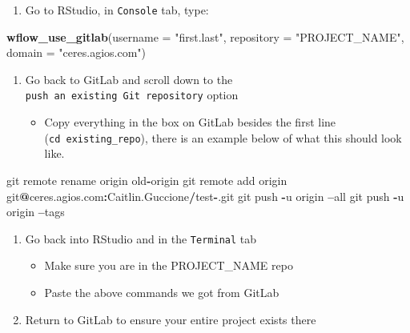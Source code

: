 \documentclass[openany]{article}
\newenvironment{Shaded}{\begin{snugshade}}{\end{snugshade}}
\newcommand{\DataTypeTok}[1]{\textcolor[rgb]{0.13,0.29,0.53}{#1}}
\newcommand{\KeywordTok}[1]{\textcolor[rgb]{0.13,0.29,0.53}{\textbf{#1}}}
\newcommand{\NormalTok}[1]{#1}
\newcommand{\OperatorTok}[1]{\textcolor[rgb]{0.81,0.36,0.00}{\textbf{#1}}}
\newcommand{\StringTok}[1]{\textcolor[rgb]{0.31,0.60,0.02}{#1}}
\providecommand{\tightlist}{%
  \setlength{\itemsep}{0pt}\setlength{\parskip}{0pt}}
\begin{document}
\begin{enumerate}
\def\labelenumi{\arabic{enumi}.}
\tightlist
\item
  Go to RStudio, in \texttt{Console} tab, type:
\end{enumerate}

\begin{Shaded}
\begin{Highlighting}[]
\KeywordTok{wflow_use_gitlab}\NormalTok{(}\DataTypeTok{username =} \StringTok{"first.last"}\NormalTok{, }
    \DataTypeTok{repository =} \StringTok{"PROJECT_NAME"}\NormalTok{, }
    \DataTypeTok{domain =} \StringTok{"ceres.agios.com"}\NormalTok{)}
\end{Highlighting}
\end{Shaded}

\begin{enumerate}
\def\labelenumi{\arabic{enumi}.}
\setcounter{enumi}{1}
\tightlist
\item
  Go back to GitLab and scroll down to the \texttt{push\ an\ existing\ Git\ repository} option

  \begin{itemize}
  \tightlist
  \item
    Copy everything in the box on GitLab besides the first line (\texttt{cd\ existing\_repo}), there is an example below of what this should look like.
  \end{itemize}
\end{enumerate}

\begin{Shaded}
\begin{Highlighting}[]
\NormalTok{git remote rename origin old}\OperatorTok{-}\NormalTok{origin}
\NormalTok{git remote add origin git}\OperatorTok{@}\NormalTok{ceres.agios.com}\OperatorTok{:}\NormalTok{Caitlin.Guccione}\OperatorTok{/}\NormalTok{test}\OperatorTok{-}\NormalTok{.git}
\NormalTok{git push }\OperatorTok{-}\NormalTok{u origin }\OperatorTok{--}\NormalTok{all}
\NormalTok{git push }\OperatorTok{-}\NormalTok{u origin }\OperatorTok{--}\NormalTok{tags}
\end{Highlighting}
\end{Shaded}

\begin{enumerate}
\def\labelenumi{\arabic{enumi}.}
\setcounter{enumi}{2}
\tightlist
\item
  Go back into RStudio and in the \texttt{Terminal} tab

  \begin{itemize}
  \tightlist
  \item
    Make sure you are in the PROJECT\_NAME repo
  \item
    Paste the above commands we got from GitLab
  \end{itemize}
\item
  Return to GitLab to ensure your entire project exists there
\end{enumerate}
\end{document}
